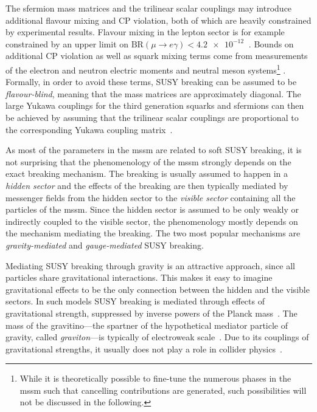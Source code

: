 The sfermion mass matrices and the trilinear scalar couplings may introduce additional flavour mixing and CP violation, both of which are heavily constrained by experimental results. Flavour mixing in the lepton sector is for example constrained by an upper limit on \mbox{$\mathrm{BR}(\mu\rightarrow e\gamma)<\SI{4.2e-12}{}$} \cite{Mori:2016vwi}. Bounds on additional CP violation as well as squark mixing terms come from measurements of the electron and neutron electric moments and neutral meson systems\footnote{While it is theoretically possible to fine-tune the numerous phases in the \gls{mssm} such that cancelling contributions are generated, such possibilities will not be discussed in the following.} \cite{pdg2020}. Formally, in order to avoid these terms, SUSY breaking can be assumed to be \textit{flavour-blind}, meaning that the mass matrices are approximately diagonal. The large Yukawa couplings for the third generation squarks and sfermions can then be achieved by assuming that the trilinear scalar couplings are proportional to the corresponding Yukawa coupling matrix~\cite{Martin:1997ns}.

As most of the parameters in the \gls{mssm} are related to soft SUSY breaking, it is not surprising that the phenomenology of the \gls{mssm} strongly depends on the exact breaking mechanism. The breaking is usually assumed to happen in a \textit{hidden sector} and the effects of the breaking are then typically mediated by messenger fields from the hidden sector to the \textit{visible sector} containing all the particles of the \gls{mssm}. Since the hidden sector is assumed to be only weakly or indirectly coupled to the visible sector, the phenomenology mostly depends on the mechanism mediating the breaking. The two most popular mechanisms are \textit{gravity-mediated} and \textit{gauge-mediated} SUSY breaking.

Mediating SUSY breaking through gravity is an attractive approach, since all particles share gravitational interactions. This makes it easy to imagine gravitational effects to be the only connection between the hidden and the visible sectors. In such models SUSY breaking is mediated through effects of gravitational strength, suppressed by inverse powers of the Planck mass~\cite{pdg2020}. The mass of the gravitino---the spartner of the hypothetical mediator particle of gravity, called \textit{graviton}---is typically of electroweak scale~\cite{Nilles:1983ge,LAHANAS19871}. Due to its couplings of gravitational strengths, it usually does not play a role in collider physics~\cite{pdg2020}.

